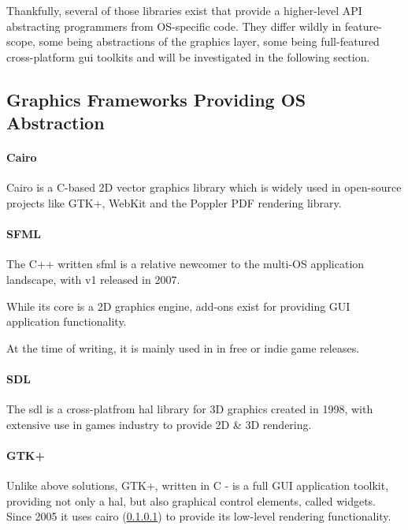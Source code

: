 Thankfully, several of those libraries exist that provide a higher-level API abstracting programmers from OS-specific code. They differ wildly in feature-scope, some being abstractions of the graphics layer, some being full-featured cross-platform \gls{gui} toolkits and will be investigated in the following section.

\subsection{Graphics Frameworks Providing OS Abstraction}
\label{sec:res_frameworks}

\paragraph{Cairo}
\label{sec:cairo}
Cairo is a C-based 2D vector graphics library which is widely used in open-source projects like GTK+, WebKit and the Poppler PDF rendering library.

\paragraph{SFML}
The C++ written \gls{sfml} is a relative newcomer to the multi-OS application landscape, with v1 released in 2007.

While its core is a 2D graphics engine, add-ons exist for providing GUI application functionality.  

At the time of writing, it is mainly used in in free or indie game releases.

\paragraph{SDL}
The \gls{sdl} is a cross-platfrom \gls{hal} library for 3D graphics created in 1998, with extensive use in games industry to provide 2D \& 3D rendering.

\paragraph{GTK+}
Unlike above solutions, GTK+, written in C - is a full GUI application toolkit, providing not only a \gls{hal}, but also graphical control elements, called widgets. Since 2005 it uses cairo (\ref{sec:cairo}) to provide its low-level rendering functionality.


